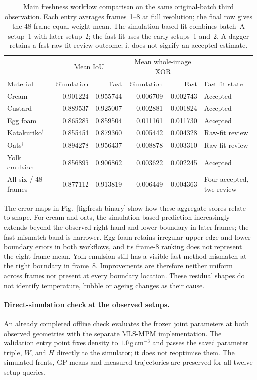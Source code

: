 \begin{table}[!htbp]
\centering\small
\setlength{\tabcolsep}{7pt}
\caption{Main freshness workflow comparison on the same original-batch
third observation. Each entry averages frames~1--8 at full resolution;
the final row gives the 48-frame equal-weight mean. The simulation-based
fit combines batch~A setup~1 with later setup~2; the fast fit
uses the early setups~1 and~2. A dagger retains a fast raw-fit-review
outcome; it does not signify an accepted estimate.}
\label{tab:fresh-workflow-results}
\begin{tabular}{@{}lrrrrl@{}}
\toprule
 & \multicolumn{2}{c}{Mean IoU} & \multicolumn{2}{c}{Mean whole-image XOR} & \\
Material & Simulation & Fast & Simulation & Fast & Fast fit state \\
\midrule
Cream & 0.901224 & 0.955744 & 0.006709 & 0.002743 & Accepted \\
Custard & 0.889537 & 0.925007 & 0.002881 & 0.001824 & Accepted \\
Egg foam & 0.865286 & 0.859504 & 0.011161 & 0.011730 & Accepted \\
Katakuriko$^\dagger$ & 0.855454 & 0.879360 & 0.005442 & 0.004328 & Raw-fit review \\
Oats$^\dagger$ & 0.894278 & 0.956437 & 0.008878 & 0.003310 & Raw-fit review \\
Yolk emulsion & 0.856896 & 0.906862 & 0.003622 & 0.002245 & Accepted \\
\midrule
All six / 48 frames & 0.877112 & 0.913819 & 0.006449 & 0.004363 & Four accepted, two review \\
\bottomrule
\end{tabular}
\end{table}

The error maps in Fig.~\ref{fig:fresh-binary} show how these aggregate
scores relate to shape. For cream and oats, the simulation-based
prediction increasingly extends beyond the observed right-hand and
lower boundary in later frames; the fast mismatch band is narrower.
Egg foam retains irregular upper-edge and lower-boundary errors in
both workflows, and its frame-8 ranking does not represent the
eight-frame mean. Yolk emulsion still has a visible fast-method
mismatch at the right boundary in frame~8. Improvements are therefore
neither uniform across frames nor present at every boundary location.
These residual shapes do not identify temperature, bubble or ageing
changes as their cause.

\paragraph{Direct-simulation check at the observed setups.}
An already completed offline check evaluates the frozen joint parameters
at both observed geometries with the separate MLS-MPM implementation.
The validation entry point fixes density to
$1.0\,\mathrm{g\,cm}^{-3}$ and passes the saved parameter triple,
$W$, and $H$ directly to the simulator; it does not reoptimise them.
The simulated fronts, GP means and measured trajectories are preserved
for all twelve setup queries.

